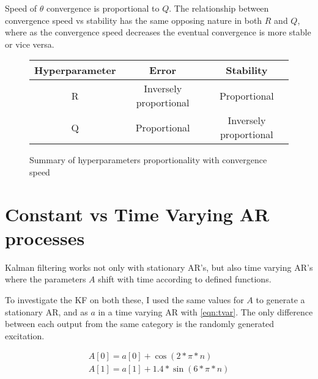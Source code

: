 \documentclass[sigconf]{acmart}
\begin{document}
Speed of $\theta$ convergence is proportional to $Q$. The relationship between convergence speed vs stability has the same opposing nature in both $R$ and $Q$, where as the convergence speed decreases the eventual convergence is more stable or vice versa. \\

\begin{figure}[H]
  \centering
\begin{tabular}{ c c c }
  Hyperparameter & Error & Stability \\
  \hline
  \hline
  R & Inversely proportional & Proportional \\
  Q & Proportional & Inversely proportional \\
\end{tabular}
\caption{Summary of hyperparameters proportionality with convergence speed}
\end{figure}
\section{Constant vs Time Varying AR processes}
Kalman filtering works not only with stationary AR's, but also time varying AR's where the parameters $A$ shift with time according to defined functions.

To investigate the KF on both these, I used the same values for $A$ to generate a stationary AR, and as $a$ in a time varying AR with \autoref{eqn:tvar}. The only difference between each output from the same category is the randomly generated excitation.

\begin{align}
  A[0] = a[0] + \cos(2 * \pi * n) \\
  A[1] = a[1] + 1.4 * \sin(6 * \pi * n) 
  \label{eqn:tvar}
\end{align}
\end{document}

